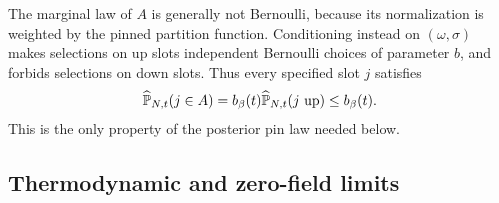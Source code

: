 The marginal law of $A$ is generally not Bernoulli, because its
normalization is weighted by the pinned partition function.
Conditioning instead on $(\omega,\sigma)$ makes selections on up
slots independent Bernoulli choices of parameter $b$, and forbids
selections on down slots.  Thus every specified slot $j$ satisfies
\begin{equation}\label{eq:fieldpinbound}
 \widehat{\mathbb P}_{N,t}(j\in A)
   =b_\beta(t)\widehat{\mathbb P}_{N,t}(j\text{ up})\le b_\beta(t).
\end{equation}
This is the only property of the posterior pin law needed below.

\subsection{Thermodynamic and zero-field limits}

